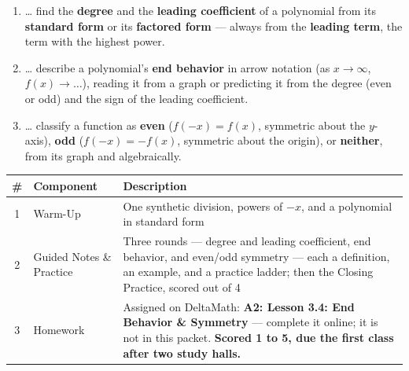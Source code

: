 \documentclass[12pt]{article}
\begin{document}

\namedateperiod
\vspace{0.18in}

\boxguard[14]
\begin{learningtargetbox}
\small
\begin{enumerate}[leftmargin=1.5em, itemsep=5pt]
  \item \ldots{} find the \textbf{degree} and the \textbf{leading coefficient} of a polynomial
        from its \textbf{standard form} or its \textbf{factored form} --- always from the
        \textbf{leading term}, the term with the highest power.
  \item \ldots{} describe a polynomial's \textbf{end behavior} in arrow notation
        (as $x\to\infty$, $f(x)\to\ldots$), reading it from a graph or predicting it from the
        degree (even or odd) and the sign of the leading coefficient.
  \item \ldots{} classify a function as \textbf{even} ($f(-x)=f(x)$, symmetric about the
        $y$-axis), \textbf{odd} ($f(-x)=-f(x)$, symmetric about the origin), or
        \textbf{neither}, from its graph and algebraically.
\end{enumerate}
\end{learningtargetbox}

\vspace{0.14in}

\boxguard[14]
\begin{tocbox}
\small
\renewcommand{\arraystretch}{1.5}
\begin{tabularx}{\linewidth}{@{} c l X @{}}
\rowcolor{forestbg}
\textbf{\#} & \textbf{Component} & \textbf{Description} \\
\midrule
1 & Warm-Up & One synthetic division, powers of $-x$, and a polynomial in standard form \\
2 & Guided Notes \& Practice & Three rounds --- degree and leading coefficient, end behavior,
              and even/odd symmetry --- each a definition, an example, and a practice ladder;
              then the Closing Practice, scored out of 4 \\
3 & Homework & Assigned on DeltaMath: \textbf{A2: Lesson 3.4: End Behavior \& Symmetry} --- complete it
              online; it is not in this packet. \textbf{Scored 1 to 5, due the first class after
              two study halls.} \\
\end{tabularx}
\end{tocbox}
\end{document}
